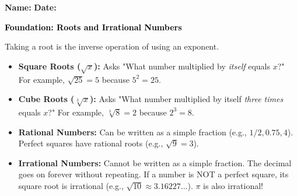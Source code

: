 \documentclass[12pt, letterpaper, fleqn]{article}
\begin{document}
\textbf{Name:} \underline{\hspace{5cm}}
\hfill
\textbf{Date:} \underline{\hspace{3cm}}\\

\begin{tcolorbox}[colback=customteal!20]
    \large\textcolor{black}{\textbf{Foundation: Roots and Irrational Numbers}}
\end{tcolorbox}

\vspace{3mm}

\noindent
Taking a root is the inverse operation of using an exponent.

\begin{itemize}
    \item \textbf{Square Roots ($\sqrt{x}$):} Asks "What number multiplied by \textit{itself} equals $x$?" For example, $\sqrt{25} = 5$ because $5^2 = 25$.
    \item \textbf{Cube Roots ($\sqrt[3]{x}$):} Asks "What number multiplied by itself \textit{three times} equals $x$?" For example, $\sqrt[3]{8} = 2$ because $2^3 = 8$.
    \item \textbf{Rational Numbers:} Can be written as a simple fraction (e.g., $1/2, 0.75, 4$). Perfect squares have rational roots (e.g., $\sqrt{9} = 3$).
    \item \textbf{Irrational Numbers:} Cannot be written as a simple fraction. The decimal goes on forever without repeating. If a number is NOT a perfect square, its square root is irrational (e.g., $\sqrt{10} \approx 3.16227...$). $\pi$ is also irrational!
\end{itemize}

\vspace{4mm}
\end{document}
